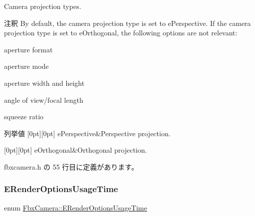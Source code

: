 Camera projection types. \begin{DoxyRemark}{注釈}
By default, the camera projection type is set to e\+Perspective. If the camera projection type is set to e\+Orthogonal, the following options are not relevant\+:
\begin{DoxyItemize}
\item aperture format
\item aperture mode
\item aperture width and height
\item angle of view/focal length
\item squeeze ratio 
\end{DoxyItemize}
\end{DoxyRemark}
\begin{DoxyEnumFields}{列挙値}
[0pt][0pt]{}\mbox{\label{class_fbx_camera_a717b9b0d28c8b20c115edf8c80016fb1aa0ea1fe68c0ac171dae64779456dec9d}} 
e\+Perspective&Perspective projection. \\
\hline

[0pt][0pt]{}\mbox{\label{class_fbx_camera_a717b9b0d28c8b20c115edf8c80016fb1aa04cb9cfd8a05c0406da47338eb62d3d}} 
e\+Orthogonal&Orthogonal projection. \\
\hline

\end{DoxyEnumFields}


 fbxcamera.\+h の 55 行目に定義があります。

\mbox{\label{class_fbx_camera_ad95b8b85dc3f8ab08c8553a089555e1d}} 
\subsubsection{\texorpdfstring{E\+Render\+Options\+Usage\+Time}{ERenderOptionsUsageTime}}
{\footnotesize\ttfamily enum \hyperlink{class_fbx_camera_ad95b8b85dc3f8ab08c8553a089555e1d}{Fbx\+Camera\+::\+E\+Render\+Options\+Usage\+Time}}

